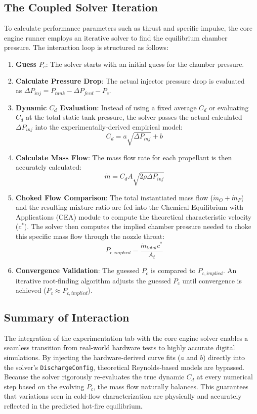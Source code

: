 \documentclass[12pt]{article}
\begin{document}
\subsection{The Coupled Solver Iteration}
To calculate performance parameters such as thrust and specific impulse, the core engine runner employs an iterative solver to find the equilibrium chamber pressure. The interaction loop is structured as follows:
\begin{enumerate}
    \item \textbf{Guess $P_c$}: The solver starts with an initial guess for the chamber pressure.
    \item \textbf{Calculate Pressure Drop}: The actual injector pressure drop is evaluated as $\Delta P_{inj} = P_{tank} - \Delta P_{feed} - P_c$.
    \item \textbf{Dynamic $C_d$ Evaluation}: Instead of using a fixed average $C_d$ or evaluating $C_d$ at the total static tank pressure, the solver passes the actual calculated $\Delta P_{inj}$ into the experimentally-derived empirical model:
    \begin{equation}
    C_d = a \sqrt{\Delta P_{inj}} + b
    \end{equation}
    \item \textbf{Calculate Mass Flow}: The mass flow rate for each propellant is then accurately calculated:
    \begin{equation}
    \dot{m} = C_d A \sqrt{2 \rho \Delta P_{inj}}
    \end{equation}
    \item \textbf{Choked Flow Comparison}: The total instantiated mass flow ($\dot{m}_{O} + \dot{m}_{F}$) and the resulting mixture ratio are fed into the Chemical Equilibrium with Applications (CEA) module to compute the theoretical characteristic velocity ($c^*$). The solver then computes the implied chamber pressure needed to choke this specific mass flow through the nozzle throat:
    \begin{equation}
    P_{c, implied} = \frac{\dot{m}_{total} c^*}{A_t}
    \end{equation}
    \item \textbf{Convergence Validation}: The guessed $P_c$ is compared to $P_{c, implied}$. An iterative root-finding algorithm adjusts the guessed $P_c$ until convergence is achieved ($P_c \approx P_{c, implied}$).
\end{enumerate}

\subsection{Summary of Interaction}
The integration of the experimentation tab with the core engine solver enables a seamless transition from real-world hardware tests to highly accurate digital simulations. By injecting the hardware-derived curve fits ($a$ and $b$) directly into the solver's \texttt{DischargeConfig}, theoretical Reynolds-based models are bypassed. Because the solver rigorously re-evaluates the true dynamic $C_d$ at every numerical step based on the evolving $P_c$, the mass flow naturally balances. This guarantees that variations seen in cold-flow characterization are physically and accurately reflected in the predicted hot-fire equilibrium.
\end{document}
